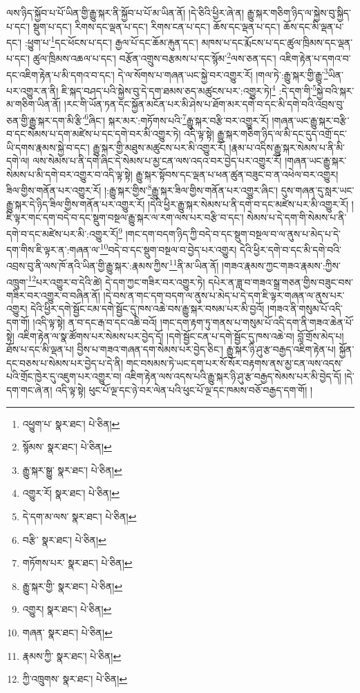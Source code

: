 ལས་ཉིད་སྐྱོབ་པ་པོ་ཡིན་གྱི་རྒྱུ་སྐར་ནི་སྐྱོབ་པ་པོ་མ་ཡིན་ནོ། །དེ་ཅིའི་ཕྱིར་ཞེ་ན། རྒྱུ་སྐར་གཅིག་ཉིད་ལ་སྐྱེས་བུ་སྐྱིད་པ་དང་། སྡུག་པ་དང་། རིགས་དང་ལྡན་པ་དང་། རིགས་ངན་པ་དང་། ཆོས་དང་ལྡན་པ་དང་། ཆོས་དང་མི་ལྡན་པ་དང་། :ཕྱུག་པ་\footnote{འཕྱུག་པ་  སྣར་ཐང་།  པེ་ཅིན། }དང་ཕོངས་པ་དང་། རྒྱལ་པོ་དང་ཆོམ་རྐུན་དང་། མཁས་པ་དང་རྨོངས་པ་དང་ཚུལ་ཁྲིམས་དང་ལྡན་པ་དང་། ཚུལ་ཁྲིམས་འཆལ་པ་དང་། བརྩོན་འགྲུས་བརྩམས་པ་དང་སྙོམ་\footnote{སྙོམས་  སྣར་ཐང་།  པེ་ཅིན། }ལས་ཅན་དང་། འཇིག་རྟེན་པ་དགའ་བ་དང་འཇིག་རྟེན་པ་མི་དགའ་བ་དང་། དེ་ལ་སོགས་པ་གཞན་ཡང་སྐྱེ་བར་འགྱུར་རོ། །གལ་ཏེ་:རྒྱུ་སྐར་གྱི་རྒྱུ་\footnote{རྒྱུ་སྐར་སྒྱུ་  སྣར་ཐང་།  པེ་ཅིན། }ཡིན་པར་འགྱུར་ན་ནི། ཇི་སྐད་བཤད་པའི་སྐྱེས་བུ་དེ་དག་ཐམས་ཅད་མཚུངས་པར་:འགྱུར་ཏེ།\footnote{འགྱུར་རོ།  སྣར་ཐང་།  པེ་ཅིན། } :དེ་དག་གི་\footnote{དེ་དག་མ་ལས་  སྣར་ཐང་།  པེ་ཅིན། }སྐྱེ་བའི་སྐར་མ་གཅིག་ཡིན་ནོ། །རང་གི་ཡོན་ཏན་དང་སྐྱོན་མངོན་པར་མི་ཤེས་པ་ཐོག་མར་དགེ་བ་དང་མི་དགེ་བའི་འབྲས་བུ་ཅན་གྱི་རྒྱུ་སྐར་དག་མི་རྩི་\footnote{བརྩི་  སྣར་ཐང་།  པེ་ཅིན། }ཞིང་། སྐར་མར་:གཏོགས་པའི་\footnote{གཏོགས་པར་  སྣར་ཐང་།  པེ་ཅིན། }རྒྱུ་སྐར་བརྩི་བར་འགྱུར་རོ། །གཞན་ཡང་རྒྱུ་སྐར་བརྩི་བ་དང་སེམས་པ་དག་མཛེས་པ་དང་དགེ་བར་མི་འགྱུར་ཏེ། འདི་ལྟ་སྟེ། རྒྱུ་སྐར་གཅིག་ཉིད་ལ་མི་དང་དུད་འགྲོ་དང་ཡི་དགས་རྣམས་སྐྱེ་བ་དང་། རྒྱུ་སྐར་གྱི་མཐུས་མཚུངས་པར་མི་འགྱུར་རོ། །རྣམ་པ་འདིས་རྒྱུ་སྐར་སེམས་པ་ནི་མི་དགེ་ལ། ལས་སེམས་པ་ནི་དགེ་ཞིང་དེ་སེམས་པ་མྱ་ངན་ལས་འདའ་བར་བྱེད་པར་འགྱུར་རོ། །གཞན་ཡང་རྒྱུ་སྐར་སེམས་པ་མི་དགེ་བར་འགྱུར་བ་འདི་ལྟ་སྟེ། རྒྱུ་སྐར་སྟོབས་དང་ལྡན་པ་ཕན་ཚུན་བཟུང་བ་ན་འཕེལ་བར་འགྱུར། ཟིལ་གྱིས་གནོན་པར་འགྱུར་རོ། །:རྒྱུ་སྐར་གྱིས་\footnote{རྒྱུ་སྐར་གྱི་  སྣར་ཐང་།  པེ་ཅིན། }རྒྱུ་སྐར་ཟིལ་གྱིས་གནོན་པར་འགྱུར་ཞིང་། དུས་གཞན་དུ་སླར་ཡང་རྒྱུ་སྐར་དེ་ཉིད་ཟིལ་གྱིས་གནོན་པར་འགྱུར་རོ། །དེའི་ཕྱིར་རྒྱུ་སྐར་སེམས་པ་ནི་དགེ་བ་དང་མཛེས་པར་མི་འགྱུར་རོ། །ཇི་ལྟར་གང་དག་བདེ་བ་དང་སྡུག་བསྔལ་རྒྱུ་སྐར་ལ་རག་ལས་པར་བརྩི་བ་དང་། སེམས་པ་དེ་དག་གི་སེམས་པ་ནི་དགེ་བ་དང་མཛེས་པར་མི་:འགྱུར་རོ།\footnote{འགྱུར།  སྣར་ཐང་།  པེ་ཅིན། } །གང་དག་བདག་ཉིད་ཀྱི་བདེ་བ་དང་སྡུག་བསྔལ་བ་ལ་ནུས་པ་མེད་པ་དེ་དག་གིས་ཇི་ལྟར་ན་:གཞན་ལ་\footnote{གཞན་  སྣར་ཐང་།  པེ་ཅིན། }བདེ་བ་དང་སྡུག་བསྔལ་བ་བྱེད་པར་འགྱུར། དེའི་ཕྱིར་དགེ་བ་དང་མི་དགེ་བའི་འབྲས་བུ་ནི་ལས་ཁོ་ནའི་ཡིན་གྱི་རྒྱུ་སྐར་:རྣམས་ཀྱིས་\footnote{རྣམས་ཀྱི་  སྣར་ཐང་།  པེ་ཅིན། }ནི་མ་ཡིན་ནོ། །གཟའ་རྣམས་ཀྱང་གཟའ་རྣམས་:ཀྱིས་འཁྲུག་\footnote{ཀྱི་འཁྲུགས་  སྣར་ཐང་།  པེ་ཅིན། }པར་འགྱུར་བ་དེའི་ཚེ། དེ་དག་ཀྱང་གཟིར་བར་འགྱུར་ཏེ། དཔེར་ན་ཟླ་བ་གཟའ་སྒྲ་གཅན་གྱིས་བཟུང་བས་གཟིར་བར་འགྱུར་བ་བཞིན་ནོ། །དེ་བས་ན་གང་དག་བདག་ལ་ནུས་པ་མེད་པ་དེ་དག་ཇི་ལྟར་གཞན་ལ་ནུས་པར་འགྱུར། དེའི་ཕྱིར་དགེ་སྦྱོང་ངམ་དགེ་སྦྱོང་དུ་ཁས་འཆེ་བས་རྒྱུ་སྐར་བསམ་པར་མི་བྱའོ། །གཟའ་ནི་གསུམ་པོ་འདི་དག་གོ། །འདི་ལྟ་སྟེ། ན་བ་དང་རྒ་བ་དང་འཆི་བའོ། །གང་དག་རྟག་ཏུ་གནས་པ་གསུམ་པོ་འདི་དག་ནི་གཟའ་ཆེན་པོ་སྟེ། འཇིག་རྟེན་ལ་སྣ་ཚོགས་པར་སེམས་པར་བྱེད་དོ། །དགེ་སྦྱོང་ངན་པ་དགེ་སྦྱོང་དུ་ཁས་འཆེ་བ། བློ་གྲོས་མེད་པ། ཐོས་པ་དང་མི་ལྡན་པ། བྱིས་པ་གཟའ་གཞན་དག་སེམས་པར་བྱེད་ཅིང་། རྒྱུ་སྐར་ཉི་ཤུ་རྩ་བརྒྱད་འཇིག་རྟེན་པ། སྐྱོན་དང་བཅས་པ་སེམས་པར་བྱེད་པ་དེ་ནི། གང་བསམས་ཏེ་ཡང་དག་པར་སོ་སོར་བརྟགས་ནས་མྱ་ངན་ལས་འདས་པའི་གྲོང་ཁྱེར་དུ་འཇུག་པར་འགྱུར་བ། འཇིག་རྟེན་ལས་འདས་པའི་རྒྱུ་སྐར་ཉི་ཤུ་རྩ་བརྒྱད་སེམས་པར་མི་བྱེད་དོ། །དེ་དག་གང་ཞེ་ན། འདི་ལྟ་སྟེ། ཕུང་པོ་ལྔ་དང་ཉེ་བར་ལེན་པའི་ཕུང་པོ་ལྔ་དང་ཁམས་བཅོ་བརྒྱད་དག་གོ། །
